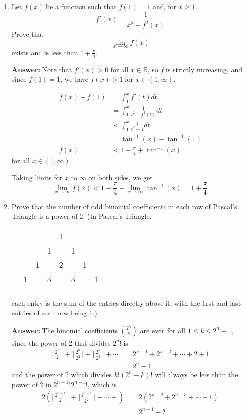 \documentclass{article}
\begin{document}
\begin{enumerate}
    \item Let $f(x)$ be a function such that $f(1) = 1$ and, for $x \geq 1$
    \[f'(x) = \frac{1}{x^2+f^2(x)}\]
    Prove that \[\lim_{x \to \infty} f(x)\] exists and is less than $1 + \frac{\pi}{4}$.
    
    \textbf{Answer:} Note that $f'(x) > 0$ for all $x \in \mathbb{R}$, so $f$ is strictly increasing, and since $f(1)=1$, we have $f(x)> 1$ for $x \in (1,\infty)$.
    
    \begin{align*}
         f(x)-f(1) & = \int_1^x f'(t) dt \\
         & = \int_1^x \frac{1}{t^2 + f^2(t)} dt \\
         & < \int_1^x \frac{1}{t^2+1} dt \\
         & = \tan^{-1}(x) - \tan^{-1}(1) \\
         f(x) &< 1 - \frac{\pi}{4} + \tan^{-1}(x)
    \end{align*}
    for all $x \in (1,\infty)$.
    
    Taking limits for $x$ to $\infty$ on both sides, we get
\[ \lim_{x \to \infty} f(x) < 1 - \frac{\pi}{4} + \lim_{x \to \infty} \tan^{-1} (x) = 1 + \frac{\pi}{4} \]
    
    
    \item Prove that the number of odd binomial coefficients in each row of Pascal's Triangle is a power of 2. (In Pascal's Triangle, 
    \begin{center}
    \begin{tabular}{ccccccccc}
    &    &    &    &  1\\\noalign{\smallskip\smallskip}
    &    &    &  1 &    &  1\\\noalign{\smallskip\smallskip}
    &    &  1 &    &  2 &    &  1\\\noalign{\smallskip\smallskip}
    &  1 &    &  3 &    &  3 &    &  1\\\noalign{\smallskip\smallskip}
    \end{tabular}
    \end{center}
    each entry is the sum of the entries directly above it, with the first and last entries of each row being 1.)
    
    \textbf{Answer:} The binomial coefficients $\binom{2^n}{k}$ are even for all $1 \leq k \leq 2^n-1$, since the power of 2 that divides $2^n!$ is 
    \begin{align*}
    \lfloor \frac{2^n}{2} \rfloor + \lfloor \frac{2^n}{2^2} \rfloor + \lfloor \frac{2^n}{2^3} \rfloor + \cdots & = 2^{n-1} + 2^{n-2} + \cdots + 2 + 1 \\
    &= 2^n - 1
    \end{align*}
    and the power of 2 which divides $k!(2^n-k)!$ will always be less than the power of 2 in $2^{n-1}!2^{n-1}!$, which is
    \begin{align*}
        2 \left( \lfloor \frac{2^{n-1}}{2} \rfloor + \lfloor \frac{2^{n-1}}{2^2} \rfloor + \cdots + \right)  &= 2(2^{n-2} + 2^{n-3} + \cdots + 1) \\
        &= 2^{n-1}-2
    \end{align*}
    

\end{enumerate}
\end{document}
